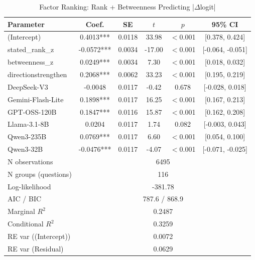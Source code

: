 \begin{table}[htbp]
\centering
\small
\caption{Factor Ranking: Rank + Betweenness Predicting |$\Delta$logit|}
\label{tab:lme_ranking_combined_table}
\begin{tabular}{lccccc}
\toprule
Parameter & Coef. & SE & $t$ & $p$ & 95\% CI \\
\midrule
  (Intercept) & 0.4013*** & 0.0118 & 33.98 & $<$0.001 & [0.378, 0.424] \\
  stated\_rank\_z & -0.0572*** & 0.0034 & -17.00 & $<$0.001 & [-0.064, -0.051] \\
  betweenness\_z & 0.0249*** & 0.0034 & 7.30 & $<$0.001 & [0.018, 0.032] \\
  directionstrengthen & 0.2068*** & 0.0062 & 33.23 & $<$0.001 & [0.195, 0.219] \\
  DeepSeek-V3 & -0.0048 & 0.0117 & -0.42 & 0.678 & [-0.028, 0.018] \\
  Gemini-Flash-Lite & 0.1898*** & 0.0117 & 16.25 & $<$0.001 & [0.167, 0.213] \\
  GPT-OSS-120B & 0.1847*** & 0.0116 & 15.87 & $<$0.001 & [0.162, 0.208] \\
  Llama-3.1-8B & 0.0204 & 0.0117 & 1.74 & 0.082 & [-0.003, 0.043] \\
  Qwen3-235B & 0.0769*** & 0.0117 & 6.60 & $<$0.001 & [0.054, 0.100] \\
  Qwen3-32B & -0.0476*** & 0.0117 & -4.07 & $<$0.001 & [-0.071, -0.025] \\
\midrule
  N observations & \multicolumn{5}{c}{6495} \\
  N groups (questions) & \multicolumn{5}{c}{116} \\
  Log-likelihood & \multicolumn{5}{c}{-381.78} \\
  AIC / BIC & \multicolumn{5}{c}{787.6 / 868.9} \\
  Marginal $R^2$ & \multicolumn{5}{c}{0.2487} \\
  Conditional $R^2$ & \multicolumn{5}{c}{0.3259} \\
  RE var ((Intercept)) & \multicolumn{5}{c}{0.0072} \\
  RE var (Residual) & \multicolumn{5}{c}{0.0629} \\
\bottomrule
\end{tabular}
\end{table}
